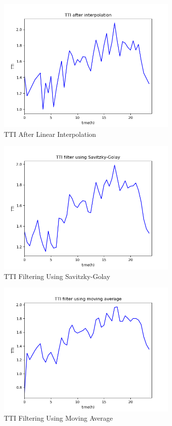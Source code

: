 \documentclass[fontset=none]{ctexart}
\theoremstyle{definition}
\theoremstyle{remark}
\begin{document}
\begin{figure}[htb]
  \centering
  \includegraphics[width=0.8\textwidth]{images/6-3-2.png}
  \caption{TTI After Linear Interpolation}
  \label{6-3-2}
\end{figure}

\begin{figure}[htb]
  \centering
  \includegraphics[width=0.8\textwidth]{images/6-3-3.png}
  \caption{TTI Filtering Using Savitzky-Golay}
  \label{6-3-3}
\end{figure}

\begin{figure}[htb]
  \centering
  \includegraphics[width=0.8\textwidth]{images/6-3-4.png}
  \caption{TTI Filtering Using Moving Average}
  \label{6-3-4}
\end{figure}
\end{document}
